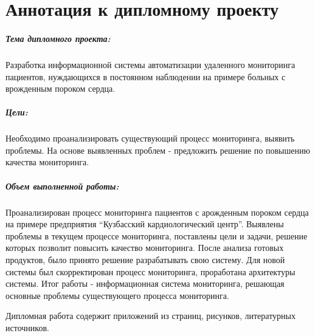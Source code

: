\section*{Аннотация к дипломному проекту}

\subparagraph{Тема дипломного проекта:}
Разработка информационной системы
автоматизации удаленного мониторинга пациентов, нуждающихся в
постоянном наблюдении на примере больных с врожденным пороком сердца.

\subparagraph{Цели:}
Необходимо проанализировать существующий процесс мониторинга, выявить проблемы.
На основе выявленных проблем - предложить решение по повышению качества
мониторинга.

\subparagraph{Объем выполненной работы:} 
Проанализирован процесс мониторинга пациентов с арожденным пороком сердца на
примере предприятия ``Кузбасский кардиологический центр''.
Выявлены проблемы в текущем процессе мониторинга, поставлены цели и задачи,
решение которых позволит повысить качество мониторинга.
После анализа готовых продуктов, было принято решение разрабатывать свою
систему.
Для новой системы был скорректирован процесс мониторинга, проработана
архитектуры системы. Итог работы - информационная система мониторинга, решающая
основные проблемы существующего процесса мониторинга.



Дипломная работа содержит  приложений из 
страниц,  рисунков,  литературных
источников.
